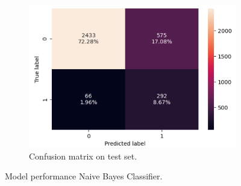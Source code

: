 \documentclass[12pt,a4paper]{article}
\begin{document}
\begin{figure}[h]
\begin{subfigure}[t]{0.45\textwidth}
			\includegraphics[width=\textwidth]{nb_c_Matrix_test.png}
			\caption{Confusion matrix on test set.}
			\label{fig: nb_c_Matrix_test}
		\end{subfigure}
		\caption{Model performance Naive Bayes Classifier.}
		\label{fig:Model performance Naive Bayes Classifier.}
	\end{figure}	
	\clearpage
\end{document}
